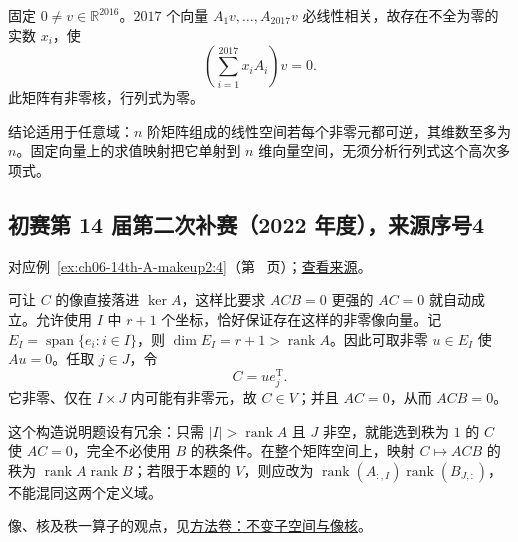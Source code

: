 \documentclass[UTF8,12pt,a4paper,fontset=fandol]{ctexart}
\begin{document}
\begin{solve}

固定 $0\ne v\in\mathbb R^{2016}$。$2017$ 个向量 $A_1v,\ldots,A_{2017}v$ 必线性相关，故存在不全为零的实数 $x_i$，使
\[
\left(\sum_{i=1}^{2017}x_iA_i\right)v=0.
\]
此矩阵有非零核，行列式为零。

\end{solve}

\begin{remark}[方法与条件]

结论适用于任意域：$n$ 阶矩阵组成的线性空间若每个非零元都可逆，其维数至多为 $n$。固定向量上的求值映射把它单射到 $n$ 维向量空间，无须分析行列式这个高次多项式。

\end{remark}

\subsection{初赛第 14 届第二次补赛（2022 年度），来源序号4}\label{ans:ch06-14th-A-makeup2:4}\label{pr:ch06-14th-A-makeup2:4}

对应例~\ref{ex:ch06-14th-A-makeup2:4}（第~\pageref{ex:ch06-14th-A-makeup2:4} 页）；\href{https://github.com/lzxcr/cmc-mathematics/blob/64916fa1fdbc3e444a652eca204d5669058ee321/src/problems/preliminary/14-makeup2/04.md}{查看来源}。

\begin{solve}

可让 $C$ 的像直接落进 $\ker A$，这样比要求 $ACB=0$ 更强的 $AC=0$ 就自动成立。允许使用 $I$ 中 $r+1$ 个坐标，恰好保证存在这样的非零像向量。记 $E_I=\operatorname{span}\{e_i:i\in I\}$，则 $\dim E_I=r+1>\operatorname{rank}A$。因此可取非零 $u\in E_I$ 使 $Au=0$。任取 $j\in J$，令
\[
C=ue_j^{\mathrm T}.
\]
它非零、仅在 $I\times J$ 内可能有非零元，故 $C\in V$；并且 $AC=0$，从而 $ACB=0$。

\end{solve}

\begin{remark}[方法与条件]

这个构造说明题设有冗余：只需 $|I|>\operatorname{rank}A$ 且 $J$ 非空，就能选到秩为 $1$ 的 $C$ 使 $AC=0$，完全不必使用 $B$ 的秩条件。在整个矩阵空间上，映射 $C\mapsto ACB$ 的秩为 $\operatorname{rank}A\operatorname{rank}B$；若限于本题的 $V$，则应改为 $\operatorname{rank}(A_{:,I})\operatorname{rank}(B_{J,:})$，不能混同这两个定义域。

像、核及秩一算子的观点，见\hyperref[app:linear-invariant]{方法卷：不变子空间与像核}。

\end{remark}
\end{document}

